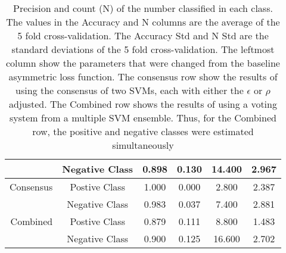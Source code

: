 \begin{table}[htp]
\begin{tabular}{rc|cccc}
           & Negative Class &      0.898 &      0.130 &     14.400 &      2.967 \\
\hline
 Consensus & Postive Class &      1.000 &      0.000 &      2.800 &      2.387 \\

           & Negative Class &      0.983 &      0.037 &      7.400 &      2.881 \\
\hline
  Combined & Postive Class &      0.879 &      0.111 &      8.800 &      1.483 \\

           & Negative Class &      0.900 &      0.125 &     16.600 &      2.702 \\
\hline
\hline
\end{tabular}
\caption{Precision and count (N) of the number classified in each class. The values in the Accuracy and N columns are the average of the 5 fold cross-validation. The Accuracy Std and N Std are the standard deviations of the 5 fold cross-validation. The leftmost column show the parameters that were changed from the baseline asymmetric loss function. The consensus row show the results of using the consensus of two SVMs, each with either the $\epsilon$ or $\rho$ adjusted. The Combined row shows the results of using a voting system from a multiple SVM ensemble. Thus, for the Combined row, the positive and negative classes were estimated simultaneously}
\end{table}

